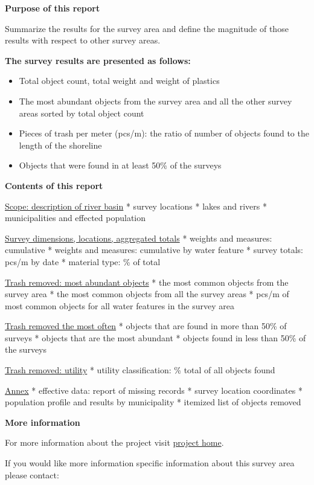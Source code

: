 \documentclass[11pt]{article}
\providecommand{\tightlist}{%
      \setlength{\itemsep}{0pt}\setlength{\parskip}{0pt}}
\begin{document}
\textbf{Purpose of this report}

Summarize the results for the survey area and define the magnitude of
those results with respect to other survey areas.

\textbf{The survey results are presented as follows:}

\begin{itemize}
\tightlist
\item
  Total object count, total weight and weight of plastics
\item
  The most abundant objects from the survey area and all the other
  survey areas sorted by total object count
\item
  Pieces of trash per meter (pcs/m): the ratio of number of objects
  found to the length of the shoreline
\item
  Objects that were found in at least 50\% of the surveys
\end{itemize}

\textbf{Contents of this report}

\hyperref[scope]{Scope: description of river basin} * survey locations *
lakes and rivers * municipalities and effected population

\hyperref[aggregatedtotals]{Survey dimensions, locations, aggregated totals}
* weights and measures: cumulative * weights and measures: cumulative by
water feature * survey totals: pcs/m by date * material type: \% of
total

\hyperref[combinedtopten]{Trash removed: most abundant objects} * the
most common objects from the survey area * the most common objects from
all the survey areas * pcs/m of most common objects for all water
features in the survey area

\hyperref[frequency]{Trash removed the most often} * objects that are
found in more than 50\% of surveys * objects that are the most abundant
* objects found in less than 50\% of the surveys

\hyperref[matanduse]{Trash removed: utility} * utility classification:
\% total of all objects found

\hyperref[annex]{Annex} * effective data: report of missing records *
survey location coordinates * population profile and results by
municipality * itemized list of objects removed

\textbf{More information}

For more information about the project visit
\href{https://www.plagespropres.ch/}{project home}.

If you would like more information specific information about this
survey area please contact:
\end{document}
